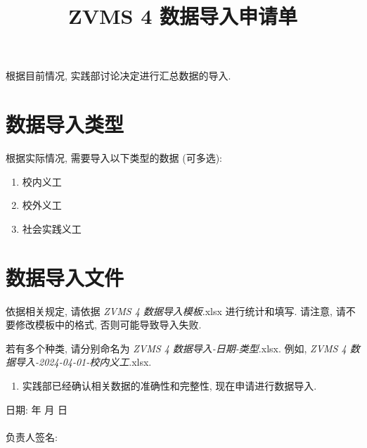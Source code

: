 \documentclass{article}
\title{ZVMS 4 数据导入申请单}
\date{}
\begin{document}
\maketitle

根据目前情况, 实践部讨论决定进行汇总数据的导入.

\section{数据导入类型}

根据实际情况, 需要导入以下类型的数据 (可多选):

\begin{enumerate}[label=$\square$]
  \item 校内义工
  \item 校外义工
  \item 社会实践义工
\end{enumerate}

\section{数据导入文件}

依据相关规定, 请依据 \textit{ZVMS 4 数据导入模板}.xlsx 进行统计和填写. 请注意, 请不要修改模板中的格式, 否则可能导致导入失败.

若有多个种类, 请分别命名为 \textit{ZVMS 4 数据导入-日期-类型}.xlsx. 例如, \textit{ZVMS 4 数据导入-2024-04-01-校内义工}.xlsx.

\begin{enumerate}[label=$\square$]
  \item 实践部已经确认相关数据的准确性和完整性, 现在申请进行数据导入.
\end{enumerate}

\begin{flushright}
  日期: \underline{\hspace{4em}} 年 \underline{\hspace{2em}} 月 \underline{\hspace{2em}} 日
  ~\\~\\
  负责人签名: \underline{\hspace{6em}}
\end{flushright}
\end{document}
